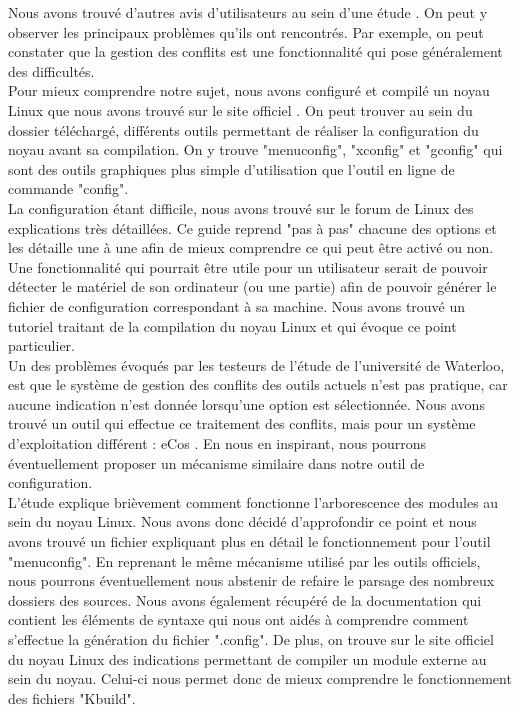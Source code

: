 \documentclass[16pts]{report}
\begin{document}
Nous avons trouvé d'autres avis d'utilisateurs au sein d'une étude
\cite{Hubaux:2012:USC:2110147.2110164}. On peut y observer les principaux
problèmes qu'ils ont rencontrés. Par exemple, on peut constater que la gestion
des conflits est une fonctionnalité qui pose généralement des difficultés.  \\

Pour mieux comprendre notre sujet, nous avons configuré et compilé un noyau
Linux que nous avons trouvé sur le site officiel \cite{Kernel}. On peut trouver
au sein du dossier téléchargé, différents outils permettant de réaliser la
configuration du noyau avant sa compilation. On y trouve "menuconfig",
"xconfig" et "gconfig" qui sont des outils graphiques plus simple d'utilisation
que l'outil en ligne de commande "config".  \\

La configuration étant difficile, nous avons trouvé sur le forum de Linux
\cite{Existant:Kernel:ForumTutoConfig} des explications très détaillées. Ce
guide reprend "pas à pas" chacune des options et les détaille une à une afin de
mieux comprendre ce qui peut être activé ou non.  \\

Une fonctionnalité qui pourrait être utile pour un utilisateur serait de
pouvoir détecter le matériel de son ordinateur (ou une partie) afin de pouvoir
générer le fichier de configuration correspondant à sa machine. Nous avons
trouvé un tutoriel \cite{Existant:Kernel:outils} traitant de la compilation du
noyau Linux et qui évoque ce point particulier.  \\

Un des problèmes évoqués par les testeurs de l'étude \cite{Waterloo:Etude} de
l'université de Waterloo, est que le système de gestion des conflits des outils
actuels n'est pas pratique, car aucune indication n'est donnée lorsqu'une
option est sélectionnée. Nous avons trouvé un outil qui effectue ce traitement
des conflits, mais pour un système d'exploitation différent : eCos
\cite{Existant:EcosConfig}. En nous en inspirant, nous pourrons éventuellement
proposer un mécanisme similaire dans notre outil de configuration.  \\

L'étude \cite{Waterloo:Etude} explique brièvement comment fonctionne
l'arborescence des modules au sein du noyau Linux. Nous avons donc décidé
d'approfondir ce point et nous avons trouvé un fichier
\cite{Existant:Kconfig:frontends} expliquant plus en détail le fonctionnement
pour l'outil "menuconfig". En reprenant le même mécanisme utilisé par les
outils officiels, nous pourrons éventuellement nous abstenir de refaire le
parsage des nombreux dossiers des sources. Nous avons également récupéré de la
documentation \cite{Existant:Kconfig:vueDensemble}
\cite{Existant:Kconfig:langage} qui contient les éléments de syntaxe qui nous
ont aidés à comprendre comment s'effectue la génération du fichier ".config".
De plus, on trouve sur le site officiel du noyau Linux des indications
\cite{Existant:Kconfig:modules} permettant de compiler un module externe au
sein du noyau. Celui-ci nous permet donc de mieux comprendre le fonctionnement
des fichiers "Kbuild".
\end{document}
